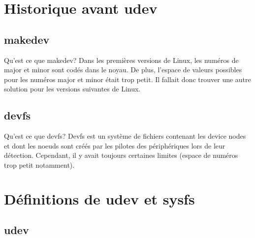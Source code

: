 \documentclass{beamer}
\begin{document}
\section{Historique avant udev}

\subsection{makedev}
\begin{frame}
\begin{block}{Qu'est ce que makedev?} 
	Dans les premières versions de Linux, les numéros de major et minor sont codés dans le noyau. De plus, l'espace de valeurs possibles pour les numéros major et minor était trop petit. 
	Il fallait donc trouver une autre solution pour les versions suivantes de Linux.
\end{block}
\end{frame}

\subsection{devfs}
\begin{frame}
\begin{block}{Qu'est ce que devfs?} 
	Devfs est un système de fichiers contenant les device nodes et dont les noeuds sont créés par les pilotes des périphériques lors de leur détection. Cependant, il y avait toujours certaines limites (espace de numéros trop petit notamment).
\end{block}
\end{frame}

\section{Définitions de udev et sysfs}

\subsection{udev}
\end{document}
